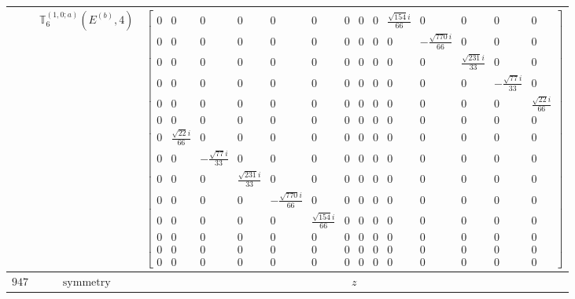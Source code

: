 \documentclass[fleqn,8pt,landscape]{jsarticle}
\begin{document}
\begin{longtable}{ccc}
$  $ & $ \mathbb{T}_{6}^{(1,0;a)}(E^{(b)},4) $ & $ \begin{bmatrix} 0 & 0 & 0 & 0 & 0 & 0 & 0 & 0 & 0 & \frac{\sqrt{154} i}{66} & 0 & 0 & 0 & 0 \\ 0 & 0 & 0 & 0 & 0 & 0 & 0 & 0 & 0 & 0 & - \frac{\sqrt{770} i}{66} & 0 & 0 & 0 \\ 0 & 0 & 0 & 0 & 0 & 0 & 0 & 0 & 0 & 0 & 0 & \frac{\sqrt{231} i}{33} & 0 & 0 \\ 0 & 0 & 0 & 0 & 0 & 0 & 0 & 0 & 0 & 0 & 0 & 0 & - \frac{\sqrt{77} i}{33} & 0 \\ 0 & 0 & 0 & 0 & 0 & 0 & 0 & 0 & 0 & 0 & 0 & 0 & 0 & \frac{\sqrt{22} i}{66} \\ 0 & 0 & 0 & 0 & 0 & 0 & 0 & 0 & 0 & 0 & 0 & 0 & 0 & 0 \\ 0 & \frac{\sqrt{22} i}{66} & 0 & 0 & 0 & 0 & 0 & 0 & 0 & 0 & 0 & 0 & 0 & 0 \\ 0 & 0 & - \frac{\sqrt{77} i}{33} & 0 & 0 & 0 & 0 & 0 & 0 & 0 & 0 & 0 & 0 & 0 \\ 0 & 0 & 0 & \frac{\sqrt{231} i}{33} & 0 & 0 & 0 & 0 & 0 & 0 & 0 & 0 & 0 & 0 \\ 0 & 0 & 0 & 0 & - \frac{\sqrt{770} i}{66} & 0 & 0 & 0 & 0 & 0 & 0 & 0 & 0 & 0 \\ 0 & 0 & 0 & 0 & 0 & \frac{\sqrt{154} i}{66} & 0 & 0 & 0 & 0 & 0 & 0 & 0 & 0 \\ 0 & 0 & 0 & 0 & 0 & 0 & 0 & 0 & 0 & 0 & 0 & 0 & 0 & 0 \\ 0 & 0 & 0 & 0 & 0 & 0 & 0 & 0 & 0 & 0 & 0 & 0 & 0 & 0 \\ 0 & 0 & 0 & 0 & 0 & 0 & 0 & 0 & 0 & 0 & 0 & 0 & 0 & 0 \end{bmatrix} $ \\ \hline
$ 947 $ & $ \text{symmetry} $ & $ z $ \\

\end{longtable}
\end{document}
